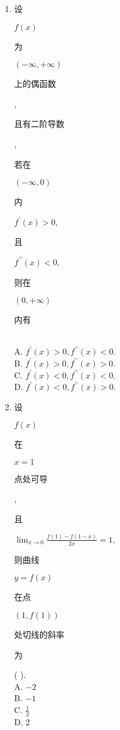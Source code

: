 \documentclass[10pt]{article}
\begin{document}
\begin{enumerate}
  \item \begin{CJK}{UTF8}{mj}设\end{CJK} $f(x)$ \begin{CJK}{UTF8}{mj}为\end{CJK} $(-\infty,+\infty)$ \begin{CJK}{UTF8}{mj}上的偶函数\end{CJK}, \begin{CJK}{UTF8}{mj}且有二阶导数\end{CJK}, \begin{CJK}{UTF8}{mj}若在\end{CJK} $(-\infty, 0)$ \begin{CJK}{UTF8}{mj}内\end{CJK} $f^{\prime}(x)>0$, \begin{CJK}{UTF8}{mj}且\end{CJK} $f^{\prime \prime}(x)<0$, \begin{CJK}{UTF8}{mj}则在\end{CJK} $(0,+\infty)$ \begin{CJK}{UTF8}{mj}内有\end{CJK}\\
A. $f^{\prime}(x)>0, f^{\prime \prime}(x)<0$.\\
B. $f^{\prime}(x)>0, f^{\prime \prime}(x)>0$.\\
C. $f^{\prime}(x)<0, f^{\prime \prime}(x)<0$.\\
D. $f^{\prime}(x)<0, f^{\prime \prime}(x)>0$.

  \item \begin{CJK}{UTF8}{mj}设\end{CJK} $f(x)$ \begin{CJK}{UTF8}{mj}在\end{CJK} $x=1$ \begin{CJK}{UTF8}{mj}点处可导\end{CJK}, \begin{CJK}{UTF8}{mj}且\end{CJK} $\lim _{x \rightarrow 0} \frac{f(1)-f(1-x)}{2 x}=1$, \begin{CJK}{UTF8}{mj}则曲线\end{CJK} $y=f(x)$ \begin{CJK}{UTF8}{mj}在点\end{CJK} $(1, f(1))$ \begin{CJK}{UTF8}{mj}处切线的斜率\end{CJK} \begin{CJK}{UTF8}{mj}为\end{CJK} ( ).\\
A. $-2$\\
B. $-1$\\
C. $\frac{1}{2}$\\
D. 2


\end{enumerate}
\end{document}
